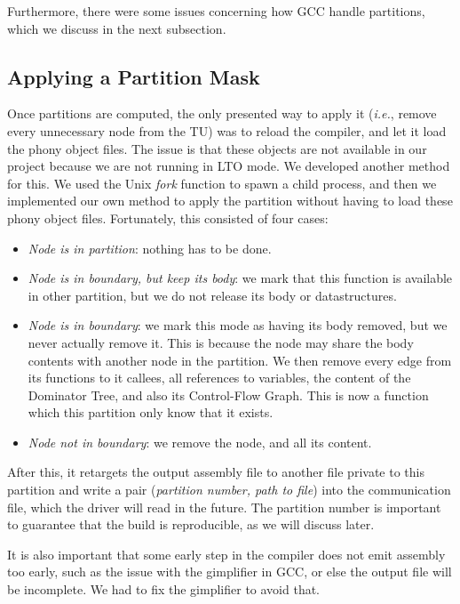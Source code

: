 \documentclass[runningheads]{llncs}
\begin{document}
Furthermore, there were some issues concerning how GCC handle
partitions, which we discuss in the next subsection.

\subsection{Applying a Partition Mask}\label{sec:partition_mask}

Once partitions are computed, the only presented way to apply it
(\textit{i.e.}, remove every unnecessary node from the TU) was to reload the
compiler, and let it load the phony object files. The issue is that these
objects are not available in our project because we are not running in LTO
mode. We developed another method for this.
We used the Unix \textit{fork} function to spawn a child process, and then
we implemented our own method to apply the partition without having to load
these phony object files. Fortunately, this consisted
of four cases:
\begin{itemize}
	\item \textit{Node is in partition}: nothing has to be done.
	\item \textit{Node is in boundary, but keep its body}: we mark that this function
	is available in other partition, but we do not release its body or
	datastructures.
	\item \textit{Node is in boundary}: we mark this mode as having its body removed,
	but we never actually remove it. This is because the node may share the
	body contents with another node in the partition. We then remove
	every edge from its functions to it callees, all references to variables,
	the content of the Dominator Tree, and also its Control-Flow Graph. This
	is now a function which this partition only know that it exists.
	\item \textit{Node not in boundary}: we remove the node, and all its content.
\end{itemize}

After this, it retargets the output assembly file to another file private to
this partition and write a pair (\textit{partition number, path to file}) into the
communication file, which the driver will read in the future. The partition
number is important to guarantee that the build is reproducible, as we will
discuss later.

It is also important that some early step in the compiler does not emit assembly
too early, such as the issue with the gimplifier in GCC, or else the output
file will be incomplete. We had to fix the gimplifier to avoid that.
\end{document}
